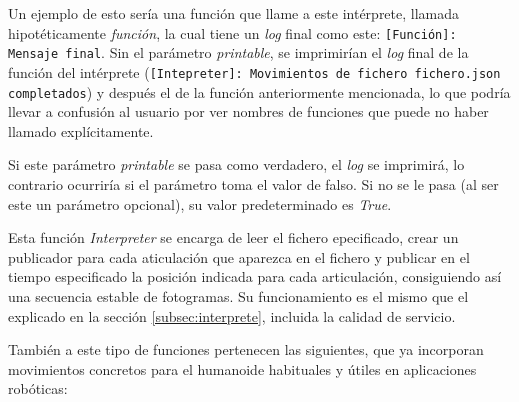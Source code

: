 Un ejemplo de esto sería una función que llame a este intérprete, llamada hipotéticamente \textit{función}, la cual tiene un \textit{log} final como este: \texttt{[Función]: Mensaje final}. Sin el parámetro \textit{printable}, se imprimirían el \textit{log} final de la función del intérprete (\texttt{[Intepreter]: Movimientos de fichero fichero.json completados}) y después el de la función anteriormente mencionada, lo que podría llevar a confusión al usuario por ver nombres de funciones que puede no haber llamado explícitamente.

Si este parámetro \textit{printable} se pasa como  verdadero, el \textit{log} se imprimirá, lo contrario ocurriría si el parámetro toma el valor de falso. Si no se le pasa (al ser este un parámetro opcional), su valor predeterminado es \textit{True}.

Esta función \textit{Interpreter} se encarga de leer el fichero epecificado, crear un publicador para cada aticulación que aparezca en el fichero y publicar en el tiempo especificado la posición indicada para  cada articulación, consiguiendo así una secuencia estable de fotogramas. Su funcionamiento es el mismo que el explicado en la sección \ref{subsec:interprete}, incluida la calidad de servicio.

También a este tipo de funciones pertenecen las siguientes, que ya incorporan movimientos concretos para el humanoide habituales y útiles en aplicaciones robóticas:

